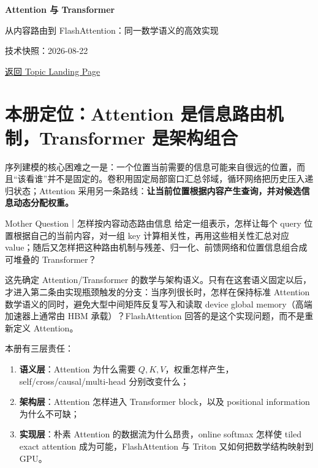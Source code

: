 \documentclass[profile=standard,twoside=false]{ipara-handbook}
\begin{document}
\begin{titlepage}
  \centering
  \vspace*{0.15\textheight}
  {\Huge\bfseries\sffamily Attention 与 Transformer\par}
  \vspace{0.8em}
  {\Large 从内容路由到 FlashAttention：同一数学语义的高效实现\par}
  \vspace{1.8em}
  {\small 技术快照：2026-08-22\par}
  \vspace{1.2em}
  {\small\href{../../40_复试/10_人工智能与机器学习/60_深度学习/06_Attention与Transformer/README.md}{返回 Topic Landing Page}\par}
\end{titlepage}

\tableofcontents

\section{本册定位：Attention 是信息路由机制，Transformer 是架构组合}

序列建模的核心困难之一是：一个位置当前需要的信息可能来自很远的位置，而且“该看谁”并不是固定的。卷积用固定局部窗口汇总邻域，循环网络把历史压入递归状态；Attention 采用另一条路线：\textbf{让当前位置根据内容产生查询，并对候选信息动态分配权重。}

\begin{mentalmodel}{Mother Question｜怎样按内容动态路由信息}
给定一组表示，怎样让每个 query 位置根据自己的当前内容，对一组 key 计算相关性，再用这些相关性汇总对应 value；随后又怎样把这种路由机制与残差、归一化、前馈网络和位置信息组合成可堆叠的 Transformer？
\end{mentalmodel}

这先确定 Attention/Transformer 的数学与架构语义。只有在这套语义固定以后，才进入第二条由实现瓶颈触发的分支：当序列很长时，怎样在保持标准 Attention 数学语义的同时，避免大型中间矩阵反复写入和读取 device global memory（高端加速器上通常由 HBM 承载）？FlashAttention 回答的是这个实现问题，而不是重新定义 Attention。

本册有三层责任：

\begin{enumerate}
  \item \textbf{语义层}：Attention 为什么需要 $Q,K,V$，权重怎样产生，self/cross/causal/multi-head 分别改变什么；
  \item \textbf{架构层}：Attention 怎样进入 Transformer block，以及 positional information 为什么不可缺；
  \item \textbf{实现层}：朴素 Attention 的数据流为什么昂贵，online softmax 怎样使 tiled exact attention 成为可能，FlashAttention 与 Triton 又如何把数学结构映射到 GPU。
\end{enumerate}
\end{document}
